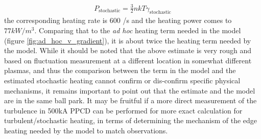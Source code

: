 \begin{align}
    P_{\text{stochastic}} = \frac{3}{2}nkT\gamma_{\text{stochastic}}
\end{align}
the corresponding heating rate is 600 /s and the  heating power comes to $77kW/m^3$. Comparing that to the \textit{ad hoc} heating term needed in the model (figure \ref{fig:ad_hoc_v_gradient}), it is about twice the \adhoc heating term needed by the model. While it should be noted that the above estimate is very rough and based on fluctuation measurement at a different location in somewhat different plasmas, and thus the comparison between the \adhoc term in the model and the estimated stochastic heating cannot confirm or dis-confirm specific physical mechanisms, it remains important to point out that the estimate and the model are in the same ball park. It may be fruitful if a more direct measurement of the turbulence in 500kA PPCD can be performed for more exact calculation for turbulent/stochastic heating, in terms of determining the mechanism of the edge heating needed by the model to match observations.